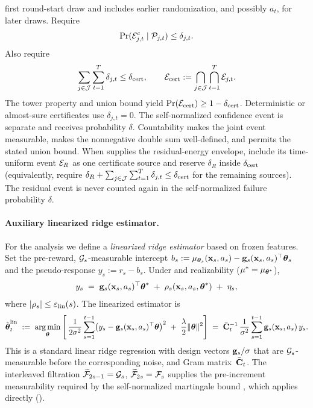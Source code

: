 first round-start draw and includes earlier randomization, and possibly $a_t$,
for later draws.  Require
\[
 \Pr(\mathcal{E}_{j,t}^c\mid\mathcal P_{j,t})\le\delta_{j,t}.
\]
Also require
\[
 \sum_{j\in\mathcal J}\sum_{t=1}^T\delta_{j,t}
 \le\delta_{\rm cert},\qquad
 \mathcal{E}_{\rm cert}:=\bigcap_{j\in\mathcal J}\bigcap_{t=1}^T\mathcal{E}_{j,t}.
\]
The tower property and union bound yield
$\Pr(\mathcal{E}_{\rm cert})\ge1-\delta_{\rm cert}$.  Deterministic or almost-sure
certificates use $\delta_{j,t}=0$.  The self-normalized confidence event is
separate and receives probability $\delta$.
Countability makes the joint event measurable, makes the nonnegative double
sum well-defined, and permits the stated union bound.
When  supplies the residual-energy envelope,
include its time-uniform event $\mathcal{E}_R$ as one certificate source and reserve
$\delta_R$ inside $\delta_{\rm cert}$ (equivalently, require
$\delta_R+\sum_{j\in\mathcal J}\sum_{t=1}^T\delta_{j,t}
\le\delta_{\rm cert}$ for the remaining
sources).  The residual event is never counted again in the self-normalized
failure probability $\delta$.



\paragraph{Auxiliary linearized ridge estimator.}
For the analysis we define a \emph{linearized ridge estimator} based on
frozen features.  Set the pre-reward, $\mathcal{G}_s$-measurable intercept
$b_s := \mu_{\boldsymbol{\theta}_s}(\mathbf{x}_s,a_s) - \mathbf{g}_s(\mathbf{x}_s,a_s)^\top\boldsymbol{\theta}_s$
and the pseudo-response $y_s := r_s - b_s$.
Under  and realizability ($\mu^*=\mu_{\boldsymbol{\theta}^*}$),
\begin{equation}\label{eq:pseudo-response}
  y_s
  \;=\;
  \mathbf{g}_s(\mathbf{x}_s,a_s)^\top\boldsymbol{\theta}^*
  \;+\;
  \rho_s(\mathbf{x}_s,a_s,\boldsymbol{\theta}^*)
  \;+\;
  \eta_s,
\end{equation}
where $|\rho_s|\le\varepsilon_{\mathrm{lin}}(s)$.
The linearized estimator is
\begin{equation}\label{eq:thetahat-lin}
  \hat{\boldsymbol{\theta}}_t^{\mathrm{lin}}
  \;:=\;
  \operatorname*{arg\,min}_{\boldsymbol{\theta}}\,\Biggl[\,
    \frac{1}{2\sigma^2}\sum_{s=1}^{t-1}
      \bigl(y_s - \mathbf{g}_s(\mathbf{x}_s,a_s)^\top\boldsymbol{\theta}\bigr)^2
    \;+\;\frac{\lambda}{2}\|\boldsymbol{\theta}\|^2
  \Biggr]
  \;=\;
  \bar{\mathbf{C}}_t^{-1}\,\frac{1}{\sigma^2}
    \sum_{s=1}^{t-1}\mathbf{g}_s(\mathbf{x}_s,a_s)\,y_s.
\end{equation}
This is a standard linear ridge regression with design vectors
$\mathbf{g}_s/\sigma$ that are $\mathcal{G}_s$-measurable before the corresponding noise,
and Gram matrix~$\bar{\mathbf{C}}_t$.  The interleaved filtration
$\widetilde{\mathcal{F}}_{2s-1}=\mathcal{G}_s$, $\widetilde{\mathcal{F}}_{2s}=\mathcal{F}_s$ supplies the
pre-increment measurability required by the self-normalized martingale bound
\citep{abbasi2011improved}, which applies directly
().




